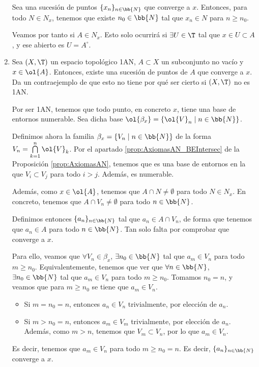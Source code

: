 \begin{ejercicio}
\begin{enumerate}[label=\alph*)]
        Sea una sucesión de puntos $\{x_n\}_{n\in \bb{N}}$ que converge a $x$. Entonces, para todo $N\in N_x$, tenemos que existe $n_0\in \bb{N}$ tal que $x_n\in N$ para $n\geq n_0$.

        Veamos por tanto si $A\in N_x$. Esto solo ocurrirá si $\exists U\in \T$ tal que $x\in U\subset A$, y ese abierto es $U=A^\circ$.

        \item Sea $(X,\T)$ un espacio topológico 1AN, $A\subset X$ un subconjunto no vacío y $x\in \ol{A}$. Entonces, existe una sucesión de puntos de $A$ que converge a $x$. Da un contraejemplo de que esto no tiene por qué ser cierto si $(X,\T)$ no es 1AN.

        Por ser 1AN, tenemos que todo punto, en concreto $x$, tiene una base de entornos numerable. Sea dicha base $\ol{\beta_x}=\{\ol{V}_n\mid n\in \bb{N}\}$.

        Definimos ahora la familia $\beta_x=\{V_n \mid n\in \bb{N}\}$ de la forma $V_n=\bigcap\limits_{k=1}^n \ol{V}_k$. Por el apartado \ref{prop:AxiomasAN_BEIntersec} de la Proposición \ref{prop:AxiomasAN}, tenemos que es una base de entornos en la que $V_i\subset V_j$ para todo $i>j$. Además, es numerable.        

        Además, como $x\in \ol{A}$, tenemos que $A\cap N\neq \emptyset$ para todo $N\in N_x$. En concreto, tenemos que $A\cap V_n\neq \emptyset$ para todo $n\in \bb{N}$.

        Definimos entonces $\{a_n\}_{n\in \bb{N}}$ tal que $a_n\in A\cap V_n$, de forma que tenemos que $a_n\in A$ para todo $n\in \bb{N}$. Tan solo falta por comprobar que converge a $x$.

        Para ello, veamos que $\forall V_n\in \beta_x$, $\exists n_0\in\bb{N}$ tal que $a_m\in V_n$ para todo $m\geq n_0$. Equivalentemente, tenemos que ver que $\forall n\in \bb{N}$, $\exists n_0\in \bb{N}$ tal que $a_m\in V_n$ para todo $m\geq n_0$. Tomamos $n_0=n$, y veamos que para $m\geq n_0$ se tiene que $a_m\in V_n$.
        \begin{itemize}
            \item Si $m=n_0=n$, entonces $a_n\in V_n$ trivialmente, por elección de $a_n$.
            \item Si $m>n_0=n$, entonces $a_m\in V_m$ trivialmente, por elección de $a_n$. Además, como $m>n$, tenemos que $V_m\subset V_n$, por lo que $a_m\in V_n$.
        \end{itemize}
        Es decir, tenemos que $a_m\in V_n$ para todo $m\geq n_0=n$. Es decir, $\{a_n\}_{n\in \bb{N}}$ converge a $x$.\\



\end{enumerate}
\end{ejercicio}
